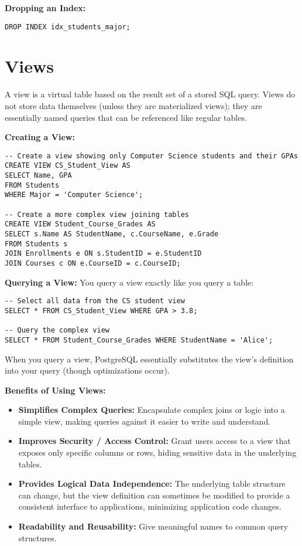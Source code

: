 \documentclass[12pt]{book}
\begin{document}
\textbf{Dropping an Index:}

\begin{lstlisting}[caption={Dropping an Index}, label=lst:drop_index]
DROP INDEX idx_students_major;
\end{lstlisting}

\section{Views}

A view is a virtual table based on the result set of a stored SQL query. Views do not store data themselves (unless they are materialized views); they are essentially named queries that can be referenced like regular tables.

\textbf{Creating a View:}

\begin{lstlisting}[caption={Creating a View}, label=lst:create_view]
-- Create a view showing only Computer Science students and their GPAs
CREATE VIEW CS_Student_View AS
SELECT Name, GPA
FROM Students
WHERE Major = 'Computer Science';

-- Create a more complex view joining tables
CREATE VIEW Student_Course_Grades AS
SELECT s.Name AS StudentName, c.CourseName, e.Grade
FROM Students s
JOIN Enrollments e ON s.StudentID = e.StudentID
JOIN Courses c ON e.CourseID = c.CourseID;
\end{lstlisting}

\textbf{Querying a View:}
You query a view exactly like you query a table:

\begin{lstlisting}[caption={Querying a View}, label=lst:query_view]
-- Select all data from the CS student view
SELECT * FROM CS_Student_View WHERE GPA > 3.8;

-- Query the complex view
SELECT * FROM Student_Course_Grades WHERE StudentName = 'Alice';
\end{lstlisting}
When you query a view, PostgreSQL essentially substitutes the view's definition into your query (though optimizations occur).

\textbf{Benefits of Using Views:}
\begin{itemize}
    \item \textbf{Simplifies Complex Queries:} Encapsulate complex joins or logic into a simple view, making queries against it easier to write and understand.
    \item \textbf{Improves Security / Access Control:} Grant users access to a view that exposes only specific columns or rows, hiding sensitive data in the underlying tables.
    \item \textbf{Provides Logical Data Independence:} The underlying table structure can change, but the view definition can sometimes be modified to provide a consistent interface to applications, minimizing application code changes.
    \item \textbf{Readability and Reusability:} Give meaningful names to common query structures.
\end{itemize}
\end{document}
